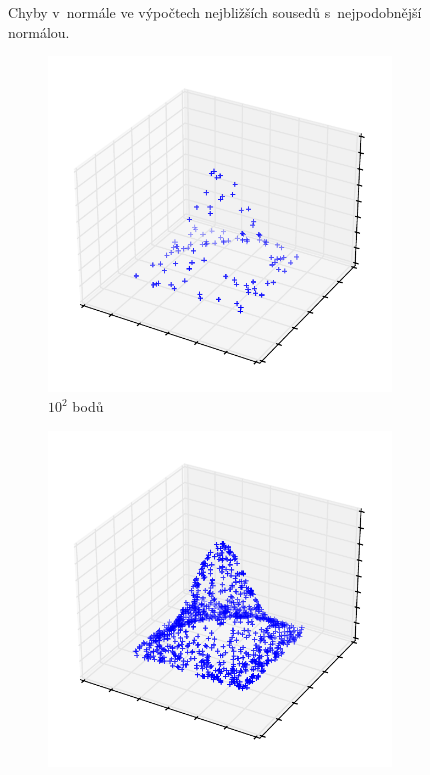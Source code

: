 \begin{figure}
\begin{subfigure}[t]{0.49\columnwidth}
\end{subfigure}
\caption{Chyby v~normále ve výpočtech nejbližších sousedů s~nejpodobnější normálou.}
\label{fig:accurucybench_normal_normal}

\end{figure}



\begin{figure}
   \centering
\begin{subfigure}[t]{0.45\columnwidth}
    \centering
    \includegraphics[scale=0.5]{obrazky-figures/knn_norm/points_3d normal_plane_100.pdf}
    \caption{$10^2$ bodů}
\end{subfigure}
\hfill
\begin{subfigure}[t]{0.45\columnwidth}
    \centering
    \includegraphics[scale=0.5]{obrazky-figures/knn_norm/points_3d normal_plane_1000.pdf}

\end{subfigure}
\end{figure}
